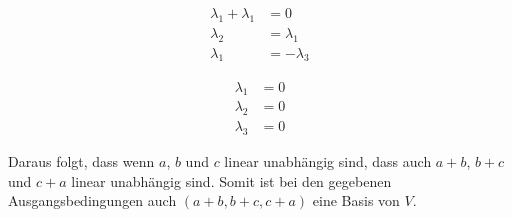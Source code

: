 \documentclass[a4paper,german,12pt,smallheadings]{scrartcl}
\begin{document}
\begin{align*}
  \lambda_1 + \lambda_1 &= 0 \\
  \lambda_2 &= \lambda_1 \\
  \lambda_1 &= -\lambda_3
\end{align*}

\begin{align*}
  \lambda_1 &= 0 \\
  \lambda_2 &= 0 \\
  \lambda_3 &= 0
\end{align*}

Daraus folgt, dass wenn $a$, $b$ und $c$ linear unabhängig sind, dass auch
$a+b$, $b+c$ und $c+a$ linear unabhängig sind. Somit ist bei den gegebenen
Ausgangsbedingungen auch $(a+b, b+c, c+a)$ eine Basis von $V$.
\end{document}
